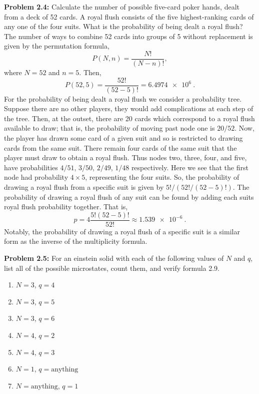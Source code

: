 \documentclass[a4paper, 12pt]{config/homework}
\begin{document}
\pagebreak\noindent
\textbf{Problem 2.4:} Calculate the number of possible five-card poker hands, dealt from a deck of 52 cards. A royal flush consists of the five highest-ranking cards of any one of the four suits. What is the probability of being dealt a royal flush?
\bigskip\noindent\\
The number of ways to combine 52 cards into groups of 5 without replacement is given by the permutation formula,
\[P(N,n)=\frac{N!}{(N-n)!},\]
where \(N=52\) and \(n=5\). Then,
\[P(52,5) = \frac{52!}{(52-5)!} = \qty{6.4974e+6}{}.\]
For the probability of being dealt a royal flush we consider a probability tree. Suppose there are no other players, they would add complications at each step of the tree. Then, at the outset, there are 20 cards which correspond to a royal flush available to draw; that is, the probability of moving past node one is \(20/52\). Now, the player has drawn some card of a given suit and so is restricted to drawing cards from the same suit. There remain four cards of the same suit that the player must draw to obtain a royal flush. Thus nodes two, three, four, and five, have probabilities \(4/51\), \(3/50\), \(2/49\), \(1/48\) respectively. Here we see that the first node had probability \(4\times 5\), representing the four suits. So, the probability of drawing a royal flush from a specific suit is given by \(5!/(52!/(52-5)!)\). The probability of drawing a royal flush of any suit can be found by adding each suits royal flush probability together. That is,
\[p = 4\frac{5!(52-5)!}{52!} \approx \qty{1.539e-6}{}.\]
Notably, the probability of drawing a royal flush of a specific suit is a similar form as the inverse of the multiplicity formula.


\pagebreak\noindent
\textbf{Problem 2.5:} For an einstein solid with each of the following values of \(N\) and \(q\), list all of the possible microstates, count them, and verify formula 2.9.
\begin{enumerate}[label=\textbf{(\alph*)}]
\item \(N=3\), \(q=4\)
\item \(N=3\), \(q=5\)
\item \(N=3\), \(q=6\)
\item \(N=4\), \(q=2\)
\item \(N=4\), \(q=3\)
\item \(N=1\), \(q=\text{anything}\)
\item \(N=\text{anything}\), \(q=1\)
\end{enumerate}
\bigskip\noindent
\end{document}
